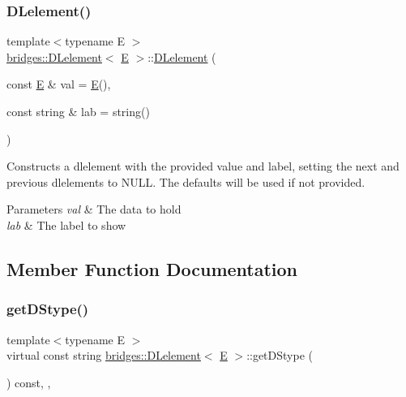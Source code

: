\subsubsection{\texorpdfstring{DLelement()}{DLelement()}\hspace{0.1cm}{\footnotesize\ttfamily [2/2]}}
{\footnotesize\ttfamily template$<$typename E $>$ \\
\mbox{\hyperlink{classbridges_1_1_d_lelement}{bridges\+::\+D\+Lelement}}$<$ \mbox{\hyperlink{namespacebridges_acfb0a4f7877d8f63de3e6862004c50eda3a3ea00cfc35332cedf6e5e9a32e94da}{E}} $>$\+::\mbox{\hyperlink{classbridges_1_1_d_lelement}{D\+Lelement}} (\begin{DoxyParamCaption}\item[{const \mbox{\hyperlink{namespacebridges_acfb0a4f7877d8f63de3e6862004c50eda3a3ea00cfc35332cedf6e5e9a32e94da}{E}} \&}]{val = {\ttfamily \mbox{\hyperlink{namespacebridges_acfb0a4f7877d8f63de3e6862004c50eda3a3ea00cfc35332cedf6e5e9a32e94da}{E}}()},  }\item[{const string \&}]{lab = {\ttfamily string()} }\end{DoxyParamCaption})\hspace{0.3cm}{\ttfamily [inline]}}

Constructs a dlelement with the provided value and label, setting the next and previous dlelements to N\+U\+LL. The defaults will be used if not provided.


\begin{DoxyParams}{Parameters}
{\em val} & The data to hold \\
\hline
{\em lab} & The label to show \\
\hline
\end{DoxyParams}


\subsection{Member Function Documentation}
\mbox{\label{classbridges_1_1_d_lelement_a109be7aba8bd3d0450859938b5d3144c}} 
\subsubsection{\texorpdfstring{getDStype()}{getDStype()}}
{\footnotesize\ttfamily template$<$typename E $>$ \\
virtual const string \mbox{\hyperlink{classbridges_1_1_d_lelement}{bridges\+::\+D\+Lelement}}$<$ \mbox{\hyperlink{namespacebridges_acfb0a4f7877d8f63de3e6862004c50eda3a3ea00cfc35332cedf6e5e9a32e94da}{E}} $>$\+::get\+D\+Stype (\begin{DoxyParamCaption}{ }\end{DoxyParamCaption}) const\hspace{0.3cm}{\ttfamily [inline]}, {\ttfamily [override]}, {\ttfamily [virtual]}}

